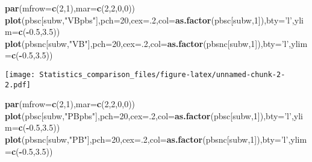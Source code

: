 \documentclass[]{article}
\newenvironment{Shaded}{\begin{snugshade}}{\end{snugshade}}
\newcommand{\KeywordTok}[1]{\textcolor[rgb]{0.13,0.29,0.53}{\textbf{#1}}}
\newcommand{\DataTypeTok}[1]{\textcolor[rgb]{0.13,0.29,0.53}{#1}}
\newcommand{\DecValTok}[1]{\textcolor[rgb]{0.00,0.00,0.81}{#1}}
\newcommand{\FloatTok}[1]{\textcolor[rgb]{0.00,0.00,0.81}{#1}}
\newcommand{\StringTok}[1]{\textcolor[rgb]{0.31,0.60,0.02}{#1}}
\newcommand{\OperatorTok}[1]{\textcolor[rgb]{0.81,0.36,0.00}{\textbf{#1}}}
\newcommand{\NormalTok}[1]{#1}
\begin{document}
\begin{Shaded}
\begin{Highlighting}[]
\KeywordTok{par}\NormalTok{(}\DataTypeTok{mfrow=}\KeywordTok{c}\NormalTok{(}\DecValTok{2}\NormalTok{,}\DecValTok{1}\NormalTok{),}\DataTypeTok{mar=}\KeywordTok{c}\NormalTok{(}\DecValTok{2}\NormalTok{,}\DecValTok{2}\NormalTok{,}\DecValTok{0}\NormalTok{,}\DecValTok{0}\NormalTok{))}
\KeywordTok{plot}\NormalTok{(pbsc[subw,}\StringTok{"VBpbs"}\NormalTok{],}\DataTypeTok{pch=}\DecValTok{20}\NormalTok{,}\DataTypeTok{cex=}\NormalTok{.}\DecValTok{2}\NormalTok{,}\DataTypeTok{col=}\KeywordTok{as.factor}\NormalTok{(pbsc[subw,}\DecValTok{1}\NormalTok{]),}\DataTypeTok{bty=}\StringTok{'l'}\NormalTok{,}\DataTypeTok{ylim=}\KeywordTok{c}\NormalTok{(}\OperatorTok{-}\FloatTok{0.5}\NormalTok{,}\FloatTok{3.5}\NormalTok{))}
\KeywordTok{plot}\NormalTok{(pbsnc[subw,}\StringTok{"VB"}\NormalTok{],}\DataTypeTok{pch=}\DecValTok{20}\NormalTok{,}\DataTypeTok{cex=}\NormalTok{.}\DecValTok{2}\NormalTok{,}\DataTypeTok{col=}\KeywordTok{as.factor}\NormalTok{(pbsnc[subw,}\DecValTok{1}\NormalTok{]),}\DataTypeTok{bty=}\StringTok{'l'}\NormalTok{,}\DataTypeTok{ylim=}\KeywordTok{c}\NormalTok{(}\OperatorTok{-}\FloatTok{0.5}\NormalTok{,}\FloatTok{3.5}\NormalTok{))}
\end{Highlighting}
\end{Shaded}

\texttt{[image: Statistics\_comparison\_files/figure-latex/unnamed-chunk-2-2.pdf]}

\begin{Shaded}
\begin{Highlighting}[]
\KeywordTok{par}\NormalTok{(}\DataTypeTok{mfrow=}\KeywordTok{c}\NormalTok{(}\DecValTok{2}\NormalTok{,}\DecValTok{1}\NormalTok{),}\DataTypeTok{mar=}\KeywordTok{c}\NormalTok{(}\DecValTok{2}\NormalTok{,}\DecValTok{2}\NormalTok{,}\DecValTok{0}\NormalTok{,}\DecValTok{0}\NormalTok{))}
\KeywordTok{plot}\NormalTok{(pbsc[subw,}\StringTok{"PBpbs"}\NormalTok{],}\DataTypeTok{pch=}\DecValTok{20}\NormalTok{,}\DataTypeTok{cex=}\NormalTok{.}\DecValTok{2}\NormalTok{,}\DataTypeTok{col=}\KeywordTok{as.factor}\NormalTok{(pbsc[subw,}\DecValTok{1}\NormalTok{]),}\DataTypeTok{bty=}\StringTok{'l'}\NormalTok{,}\DataTypeTok{ylim=}\KeywordTok{c}\NormalTok{(}\OperatorTok{-}\FloatTok{0.5}\NormalTok{,}\FloatTok{3.5}\NormalTok{))}
\KeywordTok{plot}\NormalTok{(pbsnc[subw,}\StringTok{"PB"}\NormalTok{],}\DataTypeTok{pch=}\DecValTok{20}\NormalTok{,}\DataTypeTok{cex=}\NormalTok{.}\DecValTok{2}\NormalTok{,}\DataTypeTok{col=}\KeywordTok{as.factor}\NormalTok{(pbsnc[subw,}\DecValTok{1}\NormalTok{]),}\DataTypeTok{bty=}\StringTok{'l'}\NormalTok{,}\DataTypeTok{ylim=}\KeywordTok{c}\NormalTok{(}\OperatorTok{-}\FloatTok{0.5}\NormalTok{,}\FloatTok{3.5}\NormalTok{))}
\end{Highlighting}
\end{Shaded}
\end{document}
